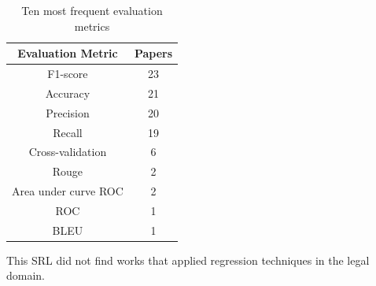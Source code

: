 \begin{table}[H]
\centering
\caption{Ten most frequent evaluation metrics}
\label{tab:rsl_freq_evaluation}
\footnotesize
\begin{tabular}{cc}
\hline
\textbf{Evaluation Metric} & \textbf{Papers} \\ \hline
F1-score                   & 23              \\
Accuracy                   & 21              \\
Precision                  & 20              \\
Recall                     & 19              \\
Cross-validation           & 6               \\
Rouge                      & 2               \\
Area under curve ROC       & 2               \\
ROC                        & 1               \\
BLEU                       & 1               \\ \bottomrule
\end{tabular}
\end{table}



This SRL did not find works that applied regression techniques in the legal domain.




